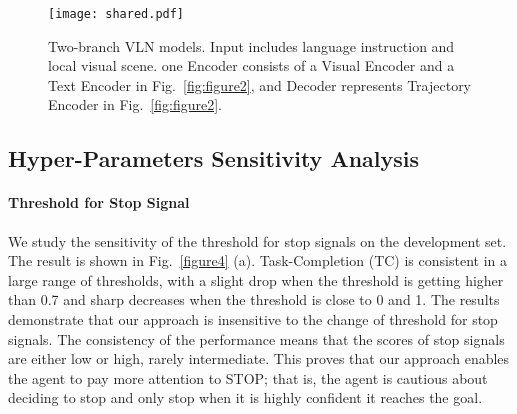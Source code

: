 \documentclass[11pt,a4paper]{article}
\begin{document}
\begin{figure}[htbp]
\begin{center}
\texttt{[image: shared.pdf]}
\end{center}
   \caption{Two-branch VLN models. Input includes language instruction and local visual scene. one Encoder consists of a Visual Encoder and a Text Encoder in Fig.~\ref{fig:figure2}, and Decoder represents Trajectory Encoder in Fig.~\ref{fig:figure2}.}
\label{figure3}
\end{figure}

\begin{table}[!th]
\small
  \centering
  \setlength{\tabcolsep}{3pt}
  \caption{Performance comparison for four different architectures of the two-branch model on the development set.}
  \label{table:shared}
\end{table}

\subsection{Hyper-Parameters Sensitivity Analysis}
\label{sec44}

\paragraph{Threshold for Stop Signal}

We study the sensitivity of the threshold for stop signals on the development set. The result is shown in Fig.~\ref{figure4} (a). Task-Completion (TC) is consistent in a large range of thresholds, with a slight drop when the threshold is getting higher than 0.7 and sharp decreases when the threshold is close to 0 and 1. The results demonstrate that our approach is insensitive to the change of threshold for stop signals. The consistency of the performance means that the scores of stop signals are either low or high, rarely intermediate. This proves that our approach enables the agent to pay more attention to STOP; that is, the agent is cautious about deciding to stop and only stop when it is highly confident it reaches the goal.
\end{document}
